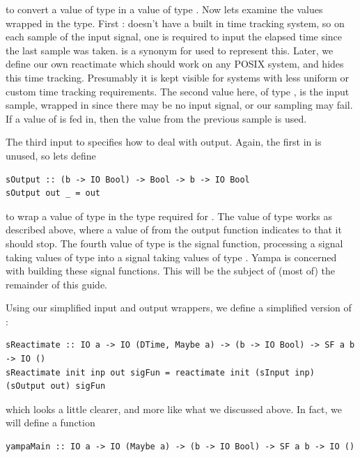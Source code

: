 \noindent to convert a value of type  in a value of type . Now lets examine the values wrapped in the  type. First :  doesn't have a built in time tracking system, so on each sample of the input signal, one is required to input the elapsed time since the last sample was taken.  is a synonym for  used to represent this. Later, we define our own reactimate which should work on any POSIX system, and hides this time tracking. Presumably it is kept visible for systems with less uniform or custom time tracking requirements. The second value here, of type , is the input sample, wrapped in  since there may be no input signal, or our sampling may fail. If a value of  is fed in, then the value from the previous sample is used.

The third input to  specifies how to deal with output. Again, the first  in  is unused, so lets define

\begin{lstlisting}
sOutput :: (b -> IO Bool) -> Bool -> b -> IO Bool
sOutput out _ = out
\end{lstlisting}

\noindent to wrap a value of type  in the type required for . The value of type  works as described above, where a value of  from the output function indicates to  that it should stop. The fourth value of type  is the signal function, processing a signal taking values of type  into a signal taking values of type . Yampa is concerned with building these signal functions. This will be the subject of (most of) the remainder of this guide.

Using our simplified input and output wrappers, we define a simplified version of :

\begin{lstlisting}
sReactimate :: IO a -> IO (DTime, Maybe a) -> (b -> IO Bool) -> SF a b -> IO ()
sReactimate init inp out sigFun = reactimate init (sInput inp) (sOutput out) sigFun
\end{lstlisting}

\noindent which looks a little clearer, and more like what we discussed above. In fact, we will define a function \yampaMain

\begin{lstlisting}
yampaMain :: IO a -> IO (Maybe a) -> (b -> IO Bool) -> SF a b -> IO ()
\end{lstlisting}

